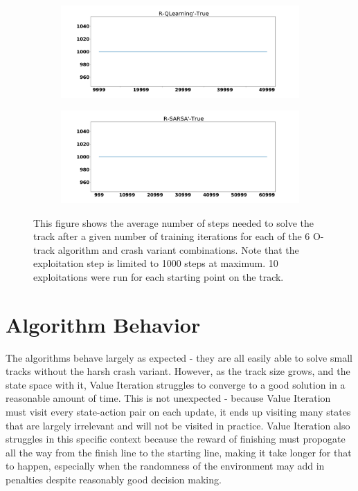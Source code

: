 \documentclass{amsart}
\begin{document}
\begin{figure}
\begin{subfigure}[t]{0.3\textwidth}
    \end{subfigure}
    \begin{subfigure}[t]{0.3\textwidth}
    \centering
    \includegraphics[width=\textwidth]{Rtrack_1_learning_rate.pdf}
    \end{subfigure}
    \begin{subfigure}[t]{0.3\textwidth}
    \centering
    \includegraphics[width=\textwidth]{Rtrack_4_learning_rate.pdf}
    \end{subfigure}
    \caption{This figure shows the average number of steps needed to solve the track after a given number of
    training iterations for each of the 6 O-track algorithm and crash variant combinations. Note that the exploitation
    step is limited to 1000 steps at maximum. 10 exploitations were run for each starting point on the track.}
    \end{figure}


    \section{Algorithm Behavior}
    The algorithms behave largely as expected - they are all easily able to solve
    small tracks without the harsh crash variant. However, as the track
    size grows, and the state space with it, Value Iteration struggles
    to converge to a good solution in a reasonable amount of time.
    This is not unexpected - because Value Iteration must visit
    every state-action pair on each update, it ends up visiting many
    states that are largely irrelevant and will not be visited in practice.
    Value Iteration also struggles in this specific context because the reward of finishing
    must propogate all the way from the finish line to the starting line, making it
    take longer for that to happen, especially when the randomness of the
    environment may add in penalties despite reasonably good decision making.
\end{document}
